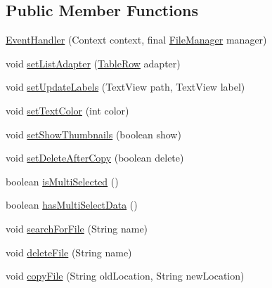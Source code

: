 \subsection*{Public Member Functions}
\begin{DoxyCompactItemize}
\item 
\hyperlink{classcom_1_1zia_1_1freshdocs_1_1widget_1_1fileexplorer_1_1_event_handler_afb74d4142aae787d4e596f50a032d13a}{Event\-Handler} (Context context, final \hyperlink{classcom_1_1zia_1_1freshdocs_1_1widget_1_1fileexplorer_1_1_file_manager}{File\-Manager} manager)
\item 
void \hyperlink{classcom_1_1zia_1_1freshdocs_1_1widget_1_1fileexplorer_1_1_event_handler_a346bf0006f2cc4ee1ff6e9c49092c22d}{set\-List\-Adapter} (\hyperlink{classcom_1_1zia_1_1freshdocs_1_1widget_1_1fileexplorer_1_1_event_handler_1_1_table_row}{Table\-Row} adapter)
\item 
void \hyperlink{classcom_1_1zia_1_1freshdocs_1_1widget_1_1fileexplorer_1_1_event_handler_af46e0e25d85763c025e7e07ea7dbc95a}{set\-Update\-Labels} (Text\-View path, Text\-View label)
\item 
void \hyperlink{classcom_1_1zia_1_1freshdocs_1_1widget_1_1fileexplorer_1_1_event_handler_ac22d5938d7801365fedef8e815ae17d0}{set\-Text\-Color} (int color)
\item 
void \hyperlink{classcom_1_1zia_1_1freshdocs_1_1widget_1_1fileexplorer_1_1_event_handler_aae357b1dd5fde9fab24dc038ab5a8cd6}{set\-Show\-Thumbnails} (boolean show)
\item 
void \hyperlink{classcom_1_1zia_1_1freshdocs_1_1widget_1_1fileexplorer_1_1_event_handler_abdc3908ebc58213b8f16870d534f526b}{set\-Delete\-After\-Copy} (boolean delete)
\item 
boolean \hyperlink{classcom_1_1zia_1_1freshdocs_1_1widget_1_1fileexplorer_1_1_event_handler_ac64f3b6fa39e3abb6df159e8b7de7047}{is\-Multi\-Selected} ()
\item 
boolean \hyperlink{classcom_1_1zia_1_1freshdocs_1_1widget_1_1fileexplorer_1_1_event_handler_a49cd65a7393a17d5e989910112721b2c}{has\-Multi\-Select\-Data} ()
\item 
void \hyperlink{classcom_1_1zia_1_1freshdocs_1_1widget_1_1fileexplorer_1_1_event_handler_aaaf8b9f675e8a960b13ec4345489c941}{search\-For\-File} (String name)
\item 
void \hyperlink{classcom_1_1zia_1_1freshdocs_1_1widget_1_1fileexplorer_1_1_event_handler_ad2320140325f6d699b00cf128e230e5d}{delete\-File} (String name)
\item 
void \hyperlink{classcom_1_1zia_1_1freshdocs_1_1widget_1_1fileexplorer_1_1_event_handler_ad43ed45d043907c9592e0530c036a4d2}{copy\-File} (String old\-Location, String new\-Location)

\end{DoxyCompactItemize}

